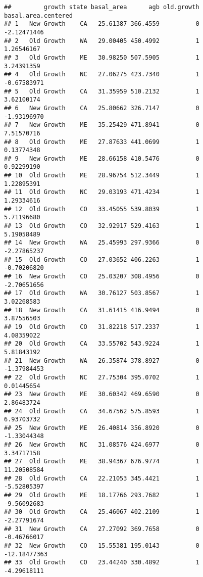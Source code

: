 \documentclass[
]{article}
\begin{document}
\begin{verbatim}
##         growth state basal_area      agb old.growth basal.area.centered
## 1   New Growth    CA   25.61387 366.4559          0         -2.12471446
## 2   Old Growth    WA   29.00405 450.4992          1          1.26546167
## 3   Old Growth    ME   30.98250 507.5905          1          3.24391359
## 4   Old Growth    NC   27.06275 423.7340          1         -0.67583971
## 5   Old Growth    CA   31.35959 510.2132          1          3.62100174
## 6   New Growth    CA   25.80662 326.7147          0         -1.93196970
## 7   New Growth    ME   35.25429 471.8941          0          7.51570716
## 8   Old Growth    ME   27.87633 441.0699          1          0.13774348
## 9   New Growth    ME   28.66158 410.5476          0          0.92299190
## 10  Old Growth    ME   28.96754 512.3449          1          1.22895391
## 11  Old Growth    NC   29.03193 471.4234          1          1.29334616
## 12  Old Growth    CO   33.45055 539.8039          1          5.71196680
## 13  Old Growth    CO   32.92917 529.4163          1          5.19058489
## 14  New Growth    WA   25.45993 297.9366          0         -2.27865237
## 15  Old Growth    CO   27.03652 406.2263          1         -0.70206820
## 16  New Growth    CO   25.03207 308.4956          0         -2.70651656
## 17  Old Growth    WA   30.76127 503.8567          1          3.02268583
## 18  New Growth    CA   31.61415 416.9494          0          3.87556503
## 19  Old Growth    CO   31.82218 517.2337          1          4.08359022
## 20  Old Growth    CA   33.55702 543.9224          1          5.81843192
## 21  New Growth    WA   26.35874 378.8927          0         -1.37984453
## 22  Old Growth    NC   27.75304 395.0702          1          0.01445654
## 23  New Growth    ME   30.60342 469.6590          0          2.86483724
## 24  Old Growth    CA   34.67562 575.8593          1          6.93703732
## 25  New Growth    ME   26.40814 356.8920          0         -1.33044348
## 26  New Growth    NC   31.08576 424.6977          0          3.34717158
## 27  Old Growth    ME   38.94367 676.9774          1         11.20508584
## 28  Old Growth    CA   22.21053 345.4421          1         -5.52805397
## 29  Old Growth    ME   18.17766 293.7682          1         -9.56092683
## 30  Old Growth    CA   25.46067 402.2109          1         -2.27791674
## 31  New Growth    CA   27.27092 369.7658          0         -0.46766017
## 32  New Growth    CO   15.55381 195.0143          0        -12.18477363
## 33  Old Growth    CO   23.44240 330.4892          1         -4.29618111

\end{verbatim}
\end{document}
